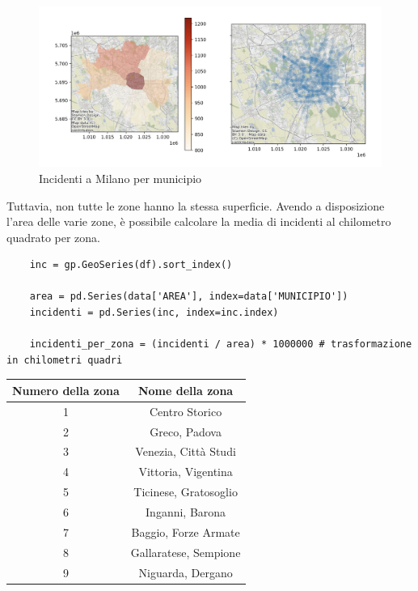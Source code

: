 \documentclass[a4paper]{report}
\begin{document}
\begin{figure}
    \includegraphics[width=\linewidth]{../src/municipi_milano/incidenti_municipio.png}
    \caption{Incidenti a Milano per municipio}
    \label{fig:heatmap-municipi}
\end{figure}

Tuttavia, non tutte le zone hanno la stessa superficie. Avendo a disposizione l'area delle varie zone, 
è possibile calcolare la media di incidenti al chilometro quadrato per zona.

\begin{lstlisting}    
    inc = gp.GeoSeries(df).sort_index()

    area = pd.Series(data['AREA'], index=data['MUNICIPIO'])
    incidenti = pd.Series(inc, index=inc.index)

    incidenti_per_zona = (incidenti / area) * 1000000 # trasformazione in chilometri quadri
\end{lstlisting}

\begin{center}
    \def\arraystretch{1.5}%
    \begin{tabular}{ |c|c| } 
    \hline
    Numero della zona & Nome della zona \\ 
    \hline
    \rowcolor{TableGray}
    1   &   Centro Storico\\
    2   &   Greco, Padova\\
    \rowcolor{TableGray}
    3   &   Venezia, Città Studi\\
    4   &   Vittoria, Vigentina \\
    \rowcolor{TableGray}
    5   &   Ticinese, Gratosoglio\\
    6   &   Inganni, Barona\\
    \rowcolor{TableGray}
    7   &   Baggio, Forze Armate\\
    8   &   Gallaratese, Sempione\\
    \rowcolor{TableGray}
    9   &   Niguarda, Dergano\\
    \hline
    \end{tabular}
\end{center}
\end{document}
